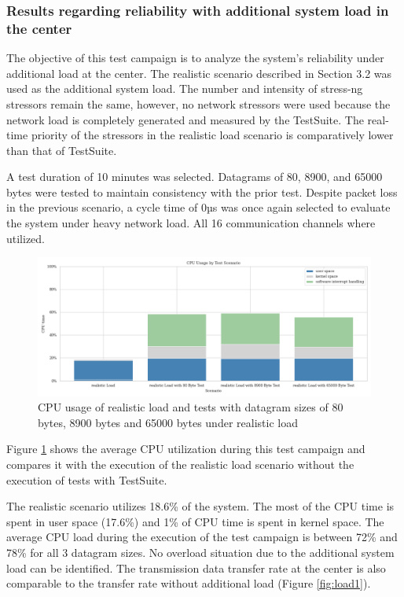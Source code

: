 \documentclass[11pt]{article}
\begin{document}
\subsubsection{Results regarding reliability with additional system load in the center}

The objective of this test campaign is to analyze the system's reliability under additional load at the center. The realistic scenario described in Section 3.2 was used as the additional system load. The number and intensity of stress-ng stressors remain the same, however, no network stressors were used because the network load is completely generated and measured by the TestSuite. The real-time priority of the stressors in the realistic load scenario is comparatively lower than that of TestSuite.

A test duration of 10 minutes was selected. Datagrams of 80, 8900, and 65000 bytes were tested to maintain consistency with the prior test. Despite packet loss in the previous scenario, a cycle time of 0µs was once again selected to evaluate the system under heavy network load. All 16 communication channels where utilized.

\begin{figure}[h]
	\includegraphics[width=\textwidth]{fig6.png}
	\centering
	\caption{CPU usage of realistic load and tests with datagram sizes of 80 bytes, 8900 bytes and 65000 bytes under realistic load}
    \label{fig:fig6}
\end{figure}

Figure \ref{fig:fig6} shows the average CPU utilization during this test campaign and compares it with the execution of the realistic load scenario without the execution of tests with TestSuite.

The realistic scenario utilizes 18.6\% of the system. The most of the CPU time is spent in user space (17.6\%) and 1\% of CPU time is spent in kernel space. The average CPU load during the execution of the test campaign is between 72\% and 78\% for all 3 datagram sizes. No overload situation due to the additional system load can be identified. The transmission data transfer rate at the center is also comparable to the transfer rate without additional load (Figure \ref{fig:load1}).
\end{document}
